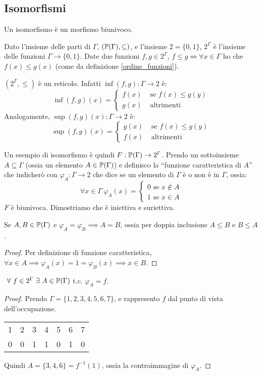 \subsection{Isomorfismi}
Un isomorfismo \`e un morfismo biunivoco.

Dato l'insieme delle parti di $\Gamma$, $(\mathbb{P}(\Gamma), \subseteq)$, e l'insieme $2 = \{ 0, 1 \}$, $2^{\Gamma}$ \`e l'insieme delle funzioni $\Gamma \to \{0,1\}$. Date due funzioni $f, g \in 2^{\Gamma}$, $f \le g \iff \forall x \in \Gamma $ ho che $ f(x) \le g(x)$ (come da  definizione \ref{ordine_funzioni}). 

$(2^{\Gamma}, \le)$ \`e un reticolo. Infatti $\inf(f,g) : \Gamma \to 2$ \`e:
\[
\inf(f,g)(x) = 
\begin{cases}
f(x) & \text{ se } f(x) \le g(y) \\
g(x) & \text{ altrimenti}
\end{cases}
\]
Analogamente, $\sup(f,g)(x) : \Gamma \to 2$ \`e:
\[
\sup(f,g)(x) = 
\begin{cases}
g(x) & \text{ se } f(x) \le g(y) \\
f(x) & \text{ altrimenti}
\end{cases}
\]

Un esempio di isomorfismo \`e quindi $F : \mathbb{P}(\Gamma) \to 2^{\Gamma}$. Prendo un sottoinsieme $A \subseteq \Gamma$ (ossia un elemento $A \in \mathbb{P}(\Gamma)$) e definisco la ``funzione caratteristica di $A$'' che indicher\`o con $\varphi_{A} : \Gamma \to 2$ che dice se un elemento di $\Gamma$ \`e o non \`e in $\Gamma$, ossia:
\[
\forall x \in \Gamma \ \varphi_A (x) = 
\begin{cases}
0 \text{ se } x \notin A \\
1 \text{ se } x \in A
\end{cases}
\]
$F$ \`e biunivoca. Dimostriamo che \`e iniettiva e suriettiva.
\begin{prop}
Se $A, B \in \mathbb{P}(\Gamma)$ e $\varphi_A = \varphi_B \implies A = B$, ossia per doppia inclusione $A \le B$ e $B \le A$.
\end{prop}
\begin{proof}
Per definizione di funzione caratteristica, $\forall x \in A \implies \varphi_A(x) = 1 = \varphi_B(x) \implies x \in B$.
\end{proof}
\begin{prop}
$\forall f \in 2^{\Gamma} \exists A \in \parts(\Gamma)$ t.c. $\varphi_A = f$.
\end{prop}
\begin{proof}
Prendo $\Gamma = \{ 1, 2, 3, 4, 5, 6, 7\}$, e rappresento $f$ dal punto di vista dell'occupazione.

\begin{tabular}{*{7}{c}}
1 & 2 & 3 & 4 & 5 & 6 & 7 \\
0 & 0 & 1 & 1 & 0 & 1 & 0
\end{tabular}

Quindi $A = \{ 3, 4, 6 \} = f^{-1} (1)$, ossia la controimmagine di $\varphi_A$.
\end{proof}

